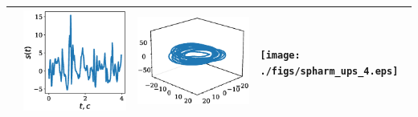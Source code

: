 \documentclass[12pt,twoside]{article}
\begin{document}
\begin{otherlanguage}{english}
\begin{table}[H]
\begin{tabular}{p{0.5cm}p{4cm}p{4cm}p{4cm}}
    & \includegraphics[scale=0.3]{./figs/time_series_ups_4.eps}
    & \includegraphics[scale=0.35]{./figs/phase_traj_ups_4.eps}
    & \texttt{[image: ./figs/spharm\_ups\_4.eps]}
    \\ 
    \hline
\end{tabular}
\label{tbl:table_of_figures}
\end{table}
\end{otherlanguage}
\end{document}
